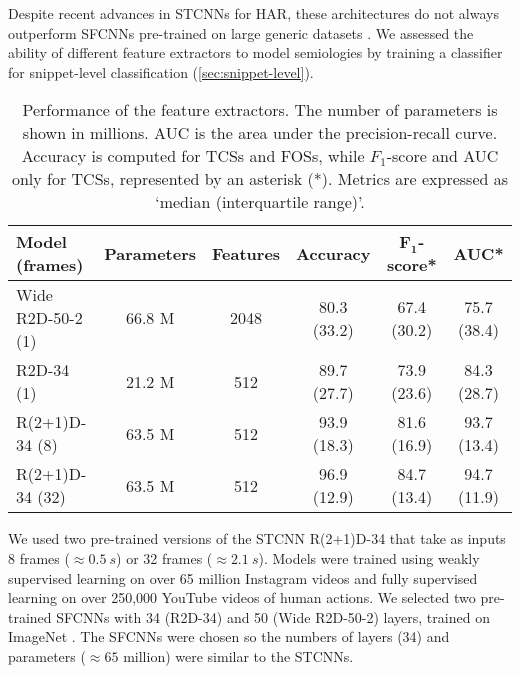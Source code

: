 Despite recent advances in \acp{STCNN} for \ac{HAR}, these architectures do not always outperform \acp{SFCNN} pre-trained on large generic datasets \cite{hutchinson_accuracy_2020}.
We assessed the ability of different feature extractors to model semiologies by training a classifier for snippet-level classification (\cref{sec:snippet-level}).

\begin{table}
  \setlength{\tabcolsep}{3pt}
  \centering
  \caption[Performance of the feature extractors]{
    Performance of the feature extractors.
    The number of parameters is shown in millions.
    AUC is the area under the precision-recall curve.
    Accuracy is computed for \acp{TCS} and \acp{FOS}, while $F_1$-score and AUC only for \acp{TCS}, represented by an asterisk (*).
    Metrics are expressed as `median (interquartile range)'.
  }
  \label{tab:models}
  \begin{tabular}{l*5c}
    \toprule
    \textbf{Model (frames)} & \textbf{Parameters} & \textbf{Features} & \textbf{Accuracy} & $\bm{F_1}$\textbf{-score}* & \textbf{AUC}* \\
    \midrule
    Wide R2D-50-2 (1)       &              66.8 M &              2048 &       80.3 (33.2) &                67.4 (30.2) &   75.7 (38.4) \\
    R2D-34 (1)              &              21.2 M &               512 &       89.7 (27.7) &                73.9 (23.6) &   84.3 (28.7) \\
    R(2+1)D-34 (8)          &              63.5 M &               512 &       93.9 (18.3) &                81.6 (16.9) &   93.7 (13.4) \\
    R(2+1)D-34 (32)         &              63.5 M &               512 &       96.9 (12.9) &                84.7 (13.4) &   94.7 (11.9) \\
    \bottomrule
  \end{tabular}
\end{table}

We used two pre-trained versions of the \ac{STCNN} R(2+1)D-34 \cite{ghadiyaram_large-scale_2019} that take as inputs 8 frames ($\approx \SI{0.5}{s}$) or 32 frames ($\approx \SI{2.1}{s}$).
Models were trained using weakly supervised learning on over 65 million Instagram videos and fully supervised learning on over 250,000 YouTube videos of human actions.
We selected two pre-trained \acp{SFCNN} with 34 (R2D-34) and 50 (Wide R2D-50-2) layers, trained on ImageNet \cite{zagoruyko_wide_2017}.
The \acp{SFCNN} were chosen so the numbers of layers (34) and parameters ($\approx 65$ million) were similar to the \acp{STCNN}.

